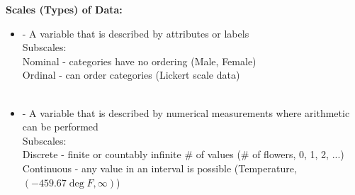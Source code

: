 \newpage

\Large \noindent \textbf{Scales (Types) of Data:}\large\\

\begin{itemize}
\item 
\textcolor{red}{} 
- A variable that is described by attributes or labels\\
\indent Subscales: \\
Nominal - categories have no ordering (Male, Female)\\
Ordinal - can order categories (Lickert scale data)\\~\\
\item 
\textcolor{red}{} 
- A variable that is described by numerical measurements where arithmetic can be performed\\
\indent Subscales: \\
Discrete - finite or countably infinite \# of values (\# of flowers, 0, 1, 2, ...)\\
Continuous - any value in an interval is possible (Temperature, $(-459.67\deg F, \infty)$)
\end{itemize}

